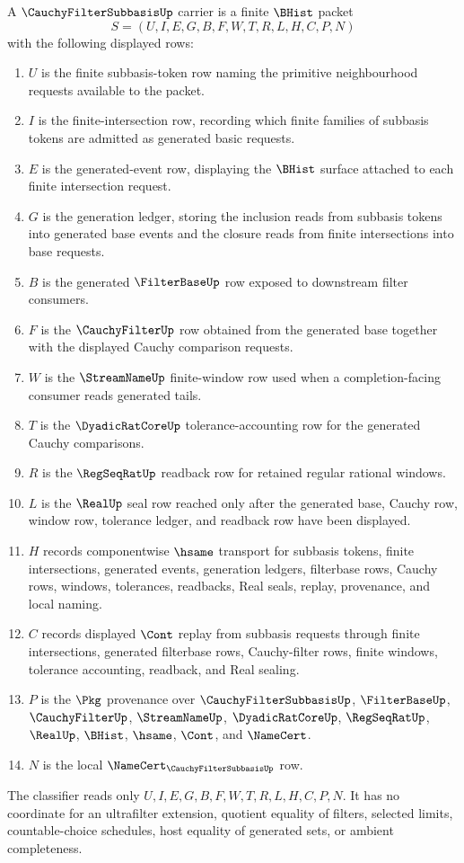\begin{definition}
\label{def:cauchy-filter-subbasis-carrier}
A $\CauchyFilterSubbasisUp$ carrier is a finite $\BHist$ packet
$$
S=(U,I,E,G,B,F,W,T,R,L,H,C,P,N)
$$
with the following displayed rows:
\begin{enumerate}
\item $U$ is the finite subbasis-token row naming the primitive neighbourhood requests available to the packet.
\item $I$ is the finite-intersection row, recording which finite families of subbasis tokens are admitted as generated basic requests.
\item $E$ is the generated-event row, displaying the $\BHist$ surface attached to each finite intersection request.
\item $G$ is the generation ledger, storing the inclusion reads from subbasis tokens into generated base events and the closure reads from finite intersections into base requests.
\item $B$ is the generated $\FilterBaseUp$ row exposed to downstream filter consumers.
\item $F$ is the $\CauchyFilterUp$ row obtained from the generated base together with the displayed Cauchy comparison requests.
\item $W$ is the $\StreamNameUp$ finite-window row used when a completion-facing consumer reads generated tails.
\item $T$ is the $\DyadicRatCoreUp$ tolerance-accounting row for the generated Cauchy comparisons.
\item $R$ is the $\RegSeqRatUp$ readback row for retained regular rational windows.
\item $L$ is the $\RealUp$ seal row reached only after the generated base, Cauchy row, window row, tolerance ledger, and readback row have been displayed.
\item $H$ records componentwise $\hsame$ transport for subbasis tokens, finite intersections, generated events, generation ledgers, filterbase rows, Cauchy rows, windows, tolerances, readbacks, Real seals, replay, provenance, and local naming.
\item $C$ records displayed $\Cont$ replay from subbasis requests through finite intersections, generated filterbase rows, Cauchy-filter rows, finite windows, tolerance accounting, readback, and Real sealing.
\item $P$ is the $\Pkg$ provenance over $\CauchyFilterSubbasisUp$, $\FilterBaseUp$, $\CauchyFilterUp$, $\StreamNameUp$, $\DyadicRatCoreUp$, $\RegSeqRatUp$, $\RealUp$, $\BHist$, $\hsame$, $\Cont$, and $\NameCert$.
\item $N$ is the local $\NameCert_{\CauchyFilterSubbasisUp}$ row.
\end{enumerate}
The classifier reads only $U,I,E,G,B,F,W,T,R,L,H,C,P,N$. It has no coordinate for an ultrafilter extension, quotient equality of filters, selected limits, countable-choice schedules, host equality of generated sets, or ambient completeness.
\end{definition}

